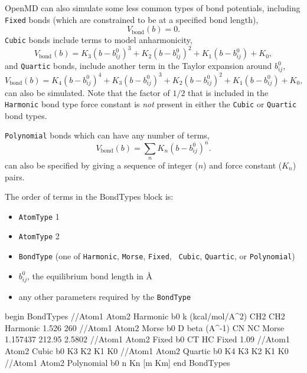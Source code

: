 \documentclass[letterpaper]{report}
\begin{document}
OpenMD can also simulate some less common types of bond potentials,
including {\tt Fixed} bonds (which are constrained to be at a
specified bond length),
\begin{equation}
V_{\text{bond}}(b) = 0.
\end{equation}
{\tt Cubic} bonds include terms to model anharmonicity,
\begin{equation}
V_{\text{bond}}(b) =  K_3 (b -  b_{ij}^0)^3 + K_2 (b - b_{ij}^0)^2 + K_1 (b -  b_{ij}^0) + K_0,
\end{equation}
and {\tt Quartic} bonds, include another term in the Taylor
expansion around $b_{ij}^0$,
\begin{equation}
V_{\text{bond}}(b) = K_4 (b -  b_{ij}^0)^4 +  K_3 (b -  b_{ij}^0)^3 +
K_2 (b - b_{ij}^0)^2 + K_1 (b -  b_{ij}^0) + K_0,
\end{equation}
can also be simulated.  Note that the factor of $1/2$ that is included
in the {\tt Harmonic} bond type force constant is {\it not} present in
either the {\tt Cubic} or {\tt Quartic} bond types.

{\tt Polynomial} bonds which can have any number of terms,
\begin{equation}
V_{\text{bond}}(b) = \sum_n K_n (b -  b_{ij}^0)^n.
\end{equation}
can also be specified by giving a sequence of integer ($n$) and force
constant ($K_n$) pairs.

The order of terms in the BondTypes block is:
\begin{itemize}
\item {\tt AtomType} 1
\item {\tt AtomType} 2
\item {\tt BondType} (one of {\tt Harmonic}, {\tt Morse}, {\tt Fixed}, {\tt
        Cubic}, {\tt Quartic}, or {\tt Polynomial})
\item $b_{ij}^0$, the equilibrium bond length in \AA
\item any other parameters required by the {\tt BondType}
\end{itemize}

\begin{code}[caption={[An example of a BondTypes block.] A
simple example of a BondTypes block.  Distances ($b_0$)
are given in \AA\ and force constants are given in
units so that when multiplied by the correct power of distance they
return energies in kcal/mol.  For example $k$ for a Harmonic bond is
in units of kcal/mol/\AA$^2$.},
label={sch:BondTypes}]
begin BondTypes
//Atom1 Atom2   Harmonic        b0        k (kcal/mol/A^2)
CH2     CH2     Harmonic        1.526     260
//Atom1 Atom2   Morse           b0        D       beta (A^-1)
CN      NC      Morse           1.157437  212.95  2.5802
//Atom1 Atom2   Fixed           b0
CT      HC      Fixed           1.09
//Atom1 Atom2   Cubic           b0        K3      K2      K1      K0
//Atom1 Atom2   Quartic         b0        K4      K3      K2      K1      K0
//Atom1 Atom2   Polynomial      b0        n       Kn      [m      Km]
end BondTypes
\end{code}
\end{document}

